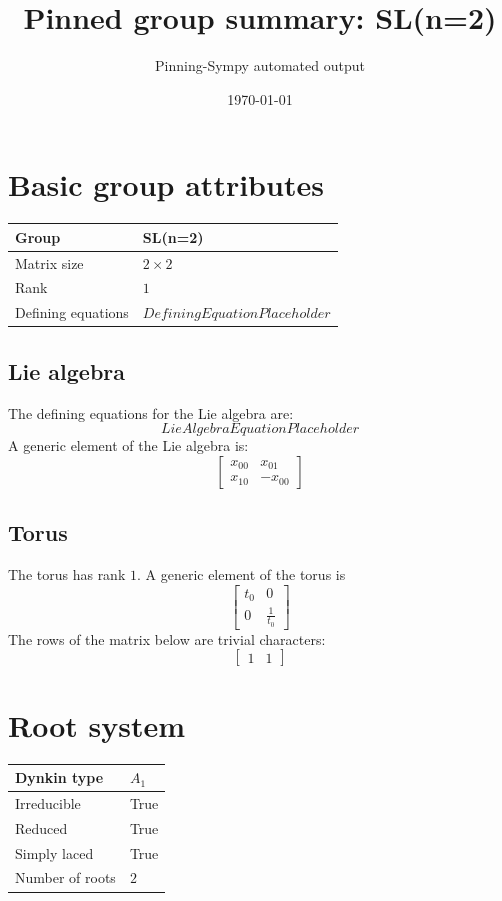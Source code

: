 \documentclass[11pt]{article}
\title{Pinned group summary: SL(n=2)}
\author{Pinning-Sympy automated output}
\date{\today}
\theoremstyle{definition}
\begin{document}
\maketitle
\tableofcontents

\newpage

\section{Basic group attributes}

\begin{tabular}{|l|l|}
	\hline
    Group & SL(n=2) \\
	\hline
    Matrix size & $2 \times 2$ \\
	\hline
    Rank & $1$ \\
	\hline
	Defining equations & $DefiningEquationPlaceholder$ \\
	\hline
\end{tabular}



\subsection{Lie algebra}

The defining equations for the Lie algebra are:
\[
LieAlgebraEquationPlaceholder
\]
A generic element of the Lie algebra is:
\[
\left[\begin{matrix}x_{0 0} & x_{0 1}\\x_{1 0} & - x_{0 0}\end{matrix}\right]
\]

\subsection{Torus}

The torus has rank $1$. A generic element of the torus is
\[
\left[\begin{matrix}t_{0} & 0\\0 & \frac{1}{t_{0}}\end{matrix}\right]
\]
The rows of the matrix below are trivial characters:
\[
\left[\begin{matrix}1 & 1\end{matrix}\right]
\]

\newpage
\section{Root system}

\begin{tabular}{|l|l|}
	\hline
    Dynkin type & $A_1$ \\
	\hline
    Irreducible & True \\
	\hline
    Reduced & True \\
	\hline
	Simply laced & True \\
	\hline
	Number of roots & $2$ \\
	\hline
\end{tabular}
\end{document}

